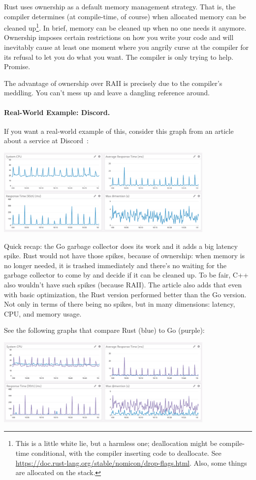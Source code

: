 Rust uses ownership as a default memory management strategy. That is, the compiler determines (at compile-time, of course) when allocated memory can be cleaned up\footnote{This is a little white lie, but a harmless one; deallocation might be compile-time conditional, with the compiler inserting code to deallocate. See \url{https://doc.rust-lang.org/stable/nomicon/drop-flags.html}. Also, some things are allocated on the stack.}. In brief, memory can be cleaned up when no one needs it anymore. Ownership imposes certain restrictions on how you write your code and will inevitably cause at least one moment where you angrily curse at the compiler for its refusal to let you do what you want. The compiler is only trying to help. Promise.

The advantage of ownership over RAII is precisely due to the compiler's meddling. You can't mess up and leave a dangling reference around.

\paragraph{Real-World Example: Discord.} If you want a real-world example of this, consider this graph from an article about a service at Discord~\cite{discord}:

\begin{center}
\includegraphics[width=0.8\textwidth]{images/golang-gc.png}
\end{center}

Quick recap: the Go garbage collector does its work and it adds a big latency spike. Rust would not have those spikes, because of ownership: when memory is no longer needed, it is trashed immediately and there's no waiting for the garbage collector to come by and decide if it can be cleaned up. To be fair, C++ also wouldn't have such spikes (because RAII). The article also adds that even with basic optimization, the Rust version performed better than the Go version. Not only in terms of there being no spikes, but in many dimensions: latency, CPU, and memory usage.

See the following graphs that compare Rust (blue) to Go (purple): 
\begin{center}
\includegraphics[width=0.8\textwidth]{images/rust-vs-go.png}
\end{center}

